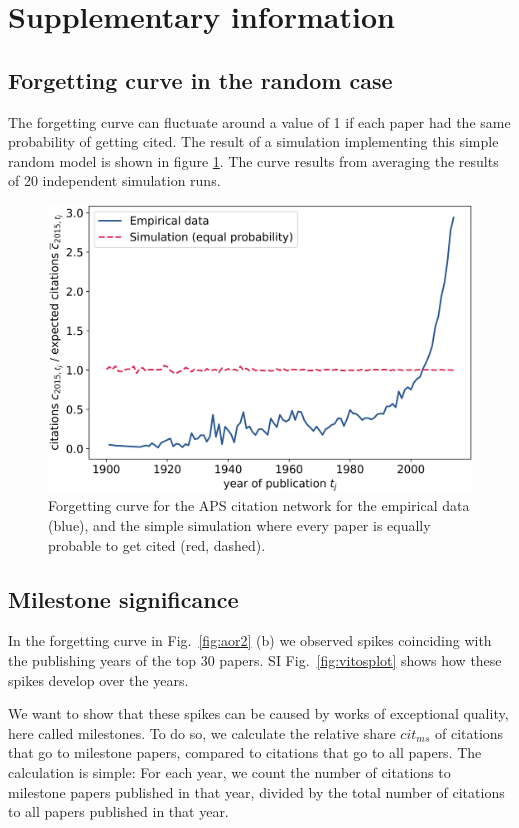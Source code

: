 \documentclass[draft,final]{vutinfth} %
\begin{document}
\section{Supplementary information}
\setcounter{page}{1}

\subsection{Forgetting curve in the random case}
\label{SI1}

The forgetting curve can fluctuate around a value of 1 if each paper had the same probability of getting cited. The result of a simulation implementing this simple random model is shown in figure \ref{fig:si1}. The curve results from averaging the results of 20 independent simulation runs.


\begin{figure}[!ht]
	\centering
	 \includegraphics[width=0.7\columnwidth]{figures_aps/SI1.png}
	\caption{Forgetting curve for the APS citation network for the empirical data (blue), and the simple simulation where every paper is equally probable to get cited (red, dashed).
	}
	\label{fig:si1}
\end{figure}


\subsection{Milestone significance}
\label{SIM2}

In the forgetting curve in Fig.~\ref{fig:aor2} (b) we observed spikes coinciding with the publishing years of the top 30 papers. SI Fig.~\ref{fig:vitosplot} shows how these spikes develop over the years.

We want to show that these spikes can be caused by works of exceptional quality, here called milestones. To do so, we calculate the relative share $cit_{ms}$ of citations that go to milestone papers, compared to citations that go to all papers. The calculation is simple: For each year, we count the number of citations to milestone papers published in that year, divided by the total number of citations to all papers published in that year.
\end{document}
